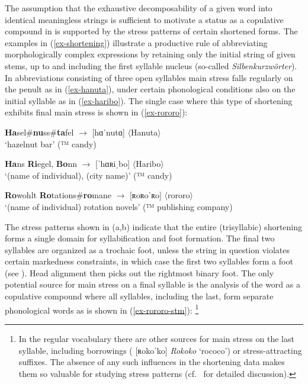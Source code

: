 \documentclass[output=paper
 ,nobabel
 ,draftmode
 ,colorlinks, citecolor=brown
]{langscibook}
\begin{document}
\noindent
The assumption that the exhaustive decomposability of a given word into identical meaningless
strings is sufficient to motivate a status as a copulative compound in  is supported by the
stress patterns of certain shortened forms. The examples in (\ref{ex-shortening}) illustrate a
productive rule of abbreviating morphologically complex expressions by retaining only the initial
string of given stems, up to and including the first syllable nucleus (so-called
\emph{Silbenkurzwörter}). In abbreviations consisting of three open syllables main stress falls
regularly on the penult as in (\ref{ex-hanuta}), under certain phonological conditions also on the
initial syllable as in (\ref{ex-haribo}). The single case where this type of shortening exhibits
final main stress is shown in (\ref{ex-rororo}):  

\eal\label{ex-shortening}
\ex\label{ex-hanuta}
\textbf{Ha}sel\#\textbf{nu}ss\#\textbf{ta}fel $\rightarrow$
[hɑˈnutɑ] $\langle$Hanuta$\rangle$\\
`hazelnut bar' (™ candy)

\ex\label{ex-haribo}
\textbf{Ha}ns \textbf{Ri}egel, \textbf{Bo}nn
$\rightarrow$ [ˈhɑʀiˌbo] $\langle$Haribo$\rangle$\\
`(name of individual), (city name)' (™ candy)

\ex\label{ex-rororo}
\textbf{Ro}wohlt \textbf{Ro}tations\#\textbf{ro}mane $\rightarrow$
[ʀoʀoˈʀo] $\langle$rororo$\rangle$\\
`(name of individual) rotation novels' (™ publishing company)
\zl

\largerpage[2]
\noindent
The stress patterns shown in (a,b) indicate that the entire (trisyllabic) shortening forms a single domain for syllabification and foot formation. The final two syllables are organized as a trochaic foot, unless the string in question violates certain markedness constraints, in which case the first two syllables form a foot (see \citet[91--92]{Raffelsiefen2021}).  Head alignment then picks out the rightmost binary foot. The only potential source for main stress on a final syllable is the analysis of the word as a copulative compound where all syllables, including the last, form separate phonological words as is shown in (\ref{ex-rororo-stm}):%
%
\footnote{In the regular vocabulary there are other sources for main stress on the last syllable, including borrowings (\eg {} [ʀokoˈko] \emph{Rokoko} `rococo') or stress-attracting suffixes. The absence of any such influences in the shortening data makes them so valuable for studying stress patterns (cf.\ \citealp{Raffelsiefen2021} for detailed discussion).}
\end{document}
